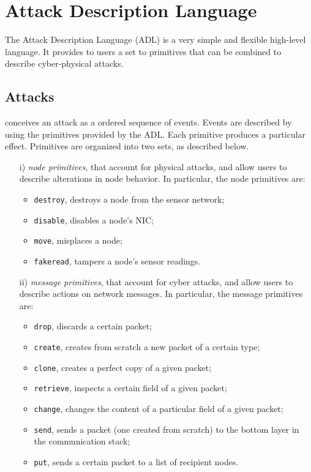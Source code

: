
\section{Attack Description Language}
\label{sec:adl}

The Attack Description Language (ADL) is a very simple and flexible high-level language. It provides to users a set to primitives that can be combined to describe cyber-physical attacks.

\subsection{Attacks}
\asf conceives an attack as a ordered sequence of events. Events are described by using the primitives provided by the ADL. Each primitive produces a particular effect. 
Primitives are organized into two sets, as described below.
%
\begin{itemize}
\item [i)] \emph{node primitives}, that account for physical attacks, and allow users to describe alterations in node behavior. In particular, the node primitives are:
\begin{itemize}
\item \texttt{destroy}, destroys a node from the sensor network;
\item \texttt{disable}, disables a node's NIC;
\item \texttt{move}, misplaces a node;
\item \texttt{fakeread}, tampers a node's sensor readings.
\end{itemize}

\item [ii)] \emph{message primitives}, that account for cyber attacks, and allow users to describe actions on network messages. In particular, the message primitives are:
\begin{itemize}
\item \texttt{drop}, discards a certain packet;
\item \texttt{create}, creates from scratch a new packet of a certain type;
\item \texttt{clone}, creates a perfect copy of a given packet;
\item \texttt{retrieve}, inspects a certain field of a given packet;
\item \texttt{change}, changes the content of a particular field of a given packet;
\item \texttt{send}, sends a packet (one created from scratch) to the bottom layer in the communication stack;
\item \texttt{put}, sends a certain packet to a list of recipient nodes.
\end{itemize}
\end{itemize}


